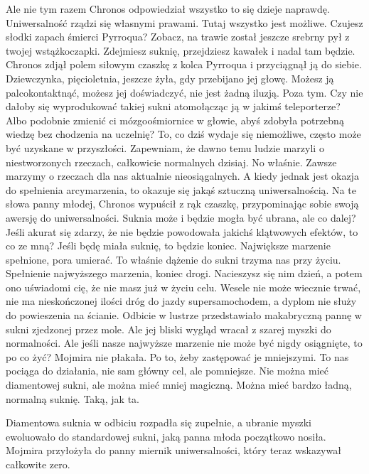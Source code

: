 \begin{dialogue}
\ds{} Ale nie tym razem \dm{} Chronos odpowiedział \dm{} wszystko to się dzieje naprawdę. Uniwersalność rządzi się własnymi prawami. Tutaj wszystko jest możliwe.
Czujesz słodki zapach śmierci Pyrroqua? Zobacz, na trawie został jeszcze srebrny pył z twojej wstążkoczapki. 
Zdejmiesz suknię, przejdziesz kawałek i nadal tam będzie. \dm{} Chronos zdjął polem siłowym czaszkę z kolca Pyrroqua i przyciągnął ją do siebie. \dm{}
Dziewczynka, pięcioletnia, jeszcze żyła, gdy przebijano jej głowę. Możesz ją palcokontaktnąć, możesz jej doświadczyć, nie jest żadną iluzją. 
Poza tym. Czy nie dałoby się wyprodukować takiej sukni atomołącząc ją w jakimś teleporterze? 
Albo podobnie zmienić ci mózgoośmiornice w głowie, abyś zdobyła potrzebną wiedzę bez chodzenia na uczelnię?
To, co dziś wydaje się niemożliwe, często może być uzyskane w przyszłości. 
Zapewniam, że dawno temu ludzie marzyli o niestworzonych rzeczach, całkowicie normalnych dzisiaj.
\ds{} No właśnie. Zawsze marzymy o rzeczach dla nas aktualnie nieosiągalnych.
A kiedy jednak jest okazja do spełnienia arcymarzenia, to okazuje się jakąś sztuczną uniwersalnością. \dm{} Na te słowa panny młodej, Chronos wypuścił z rąk czaszkę,
przypominając sobie swoją awersję do uniwersalności. \dm{} Suknia może i będzie mogła być ubrana, ale co dalej? Jeśli akurat się zdarzy, że nie będzie powodowała
jakichś klątwowych efektów, to co ze mną? Jeśli będę miała suknię, to będzie koniec. Największe marzenie spełnione, pora umierać.
To właśnie dążenie do sukni trzyma nas przy życiu. Spełnienie najwyższego marzenia, koniec drogi. 
Nacieszysz się nim dzień, a potem ono uświadomi cię, że nie masz już w życiu celu.
Wesele nie może wiecznie trwać, nie ma nieskończonej ilości dróg do jazdy supersamochodem, a dyplom nie służy do powieszenia na ścianie. \dm{} 
Odbicie w lustrze przedstawiało makabryczną pannę w sukni zjedzonej przez mole. Ale jej bliski wygląd wracał z szarej myszki do normalności.
\ds{} Ale jeśli nasze najwyższe marzenie nie może być nigdy osiągnięte, to po co żyć? \dm{} Mojmira nie płakała.
\ds{} Po to, żeby zastępować je mniejszymi. To nas pociąga do działania, nie sam główny cel, ale pomniejsze. 
Nie można mieć diamentowej sukni, ale można mieć mniej magiczną. Można mieć bardzo ładną, normalną suknię.
Taką, jak ta.
\end{dialogue}

Diamentowa suknia w odbiciu rozpadła się zupełnie, a ubranie myszki ewoluowało do standardowej sukni, jaką panna młoda początkowo nosiła.
Mojmira przyłożyła do panny miernik uniwersalności, który teraz wskazywał całkowite zero.

